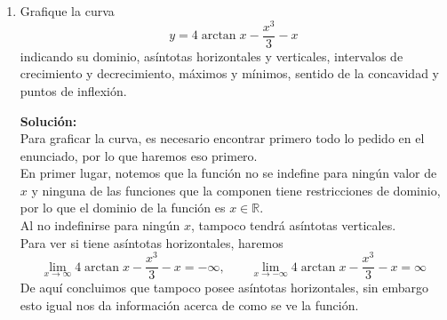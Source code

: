 \documentclass[12pt]{article}
\newenvironment{solucion}
{\begin{mdframed}[backgroundcolor=black!10]
		{\bf Solución:}\\
	}
	{
	\end{mdframed}
}
\newenvironment{preguntas}
{\begin{enumerate}\itemsep12pt
	}
	{
	\end{enumerate}
}
\newcommand{\ra}{\rightarrow}
\newcommand{\R}{\mathbb{R}}
\begin{document}
\begin{preguntas}
\begin{solucion}
\begin{enumerate}[a)]
\item Los candidatos a asíntotas horizontales son los puntos donde la función se indefine. En este caso, solo tenemos $x=0$. Para comprobar, buscamos
{\small$$\lim\limits_{x \ra 0+} f(x) =
x + 1 - \dfrac{2}{x} - 3\dfrac{ln(x)}{x} = 
\lim\limits_{x \ra 0+} f(x) = 
\dfrac{x^2+x - 2 - 3ln(x)}{x} = 
\dfrac{\infty}{0} = 
\infty
$$}\\
Es decir, la recta $x=1$ es una asíntota vertical de $f$.\\

Para ver la existencia de asíntotas horizontales, buscamos
$$
\lim\limits_{x \ra \infty} f(x) =
\lim\limits_{x \ra \infty} x + 1 - \dfrac{2}{x} - 3\dfrac{ln(x)}{x}$$
Notemos que
$$\lim\limits_{x \ra \infty} 3\dfrac{ln(x)}{x} \stackrel{L'H}{=}
\dfrac{3}{x} = 0
$$
Por lo que
$$
\lim\limits_{x \ra \infty} f(x) =
\lim\limits_{x \ra \infty} x + 1 - \dfrac{2}{x} - 3\dfrac{ln(x)}{x} = \infty$$
Por ende, no existen asíntotas horizontales.
\item 
\end{enumerate}
\end{solucion}
\item Grafique la curva
$$y = 4\arctan x - \dfrac{x^3}{3} - x$$
indicando su dominio, asíntotas horizontales y verticales, intervalos de crecimiento y decrecimiento, máximos y mínimos, sentido de la concavidad y puntos de inflexión.
\begin{solucion}
Para graficar la curva, es necesario encontrar primero todo lo pedido en el enunciado, por lo que haremos eso primero.\\

En primer lugar, notemos que la función no se indefine para ningún valor de $x$ y ninguna de las funciones que la componen tiene restricciones de dominio, por lo que el dominio de la función es $x \in \R$.\\

Al no indefinirse para ningún $x$, tampoco tendrá asíntotas verticales.\\

Para ver si tiene asíntotas horizontales, haremos
$$\lim\limits_{x\ra \infty}  4\arctan x - \dfrac{x^3}{3} - x = -\infty, \qquad \lim\limits_{x\ra -\infty}  4\arctan x - \dfrac{x^3}{3} - x = \infty$$
De aquí concluimos que tampoco posee asíntotas horizontales, sin embargo esto igual nos da información acerca de como se ve la función.\\


\end{solucion}
\end{preguntas}
\end{document}
